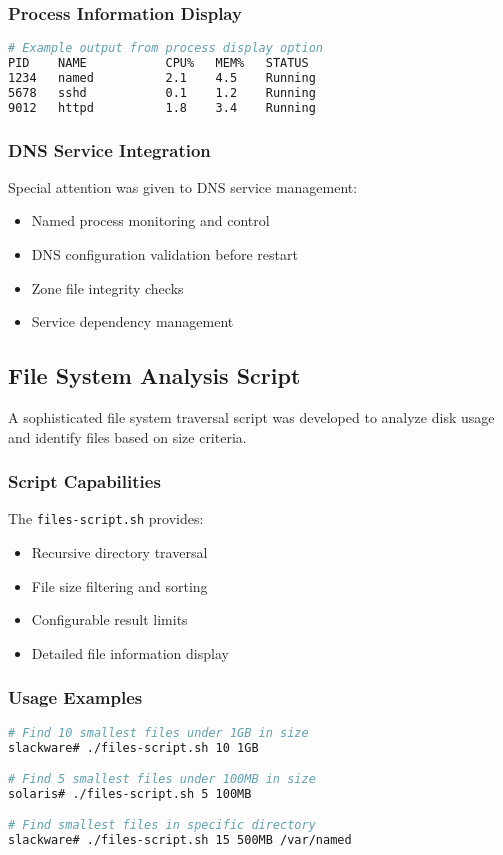\documentclass[12pt,a4paper]{article}
\begin{document}
\subsubsection{Process Information Display}
\begin{lstlisting}[language=bash, caption=Process Information Example]
# Example output from process display option
PID    NAME           CPU%   MEM%   STATUS
1234   named          2.1    4.5    Running
5678   sshd           0.1    1.2    Running
9012   httpd          1.8    3.4    Running
\end{lstlisting}

\subsubsection{DNS Service Integration}
Special attention was given to DNS service management:
\begin{itemize}
    \item Named process monitoring and control
    \item DNS configuration validation before restart
    \item Zone file integrity checks
    \item Service dependency management
\end{itemize}

\subsection{File System Analysis Script}\label{subsec:filesystem-analysis}

A sophisticated file system traversal script was developed to analyze disk usage and identify files based on size criteria.

\subsubsection{Script Capabilities}
The \texttt{files-script.sh} provides:
\begin{itemize}
    \item Recursive directory traversal
    \item File size filtering and sorting
    \item Configurable result limits
    \item Detailed file information display
\end{itemize}

\subsubsection{Usage Examples}
\begin{lstlisting}[language=bash, caption=File System Analysis Usage]
# Find 10 smallest files under 1GB in size
slackware# ./files-script.sh 10 1GB

# Find 5 smallest files under 100MB in size
solaris# ./files-script.sh 5 100MB

# Find smallest files in specific directory
slackware# ./files-script.sh 15 500MB /var/named
\end{lstlisting}
\end{document}
